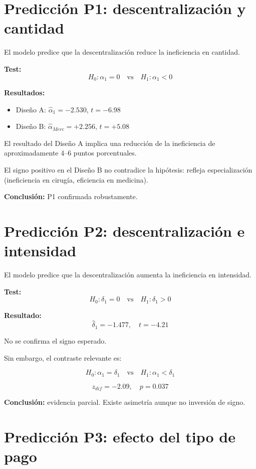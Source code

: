 \documentclass[12pt]{article}
\begin{document}
\section{Predicción P1: descentralización y cantidad}

El modelo predice que la descentralización reduce la ineficiencia en cantidad.

\textbf{Test:}
\[
H_0: \alpha_1 = 0 \quad \text{vs} \quad H_1: \alpha_1 < 0
\]

\textbf{Resultados:}
\begin{itemize}
\item Diseño A: $\hat{\alpha}_1 = -2.530$, $t = -6.98$
\item Diseño B: $\hat{\alpha}_{Merc} = +2.256$, $t = +5.08$
\end{itemize}

El resultado del Diseño A implica una reducción de la ineficiencia de aproximadamente 4--6 puntos porcentuales.

El signo positivo en el Diseño B no contradice la hipótesis: refleja especialización (ineficiencia en cirugía, eficiencia en medicina).

\textbf{Conclusión:} P1 confirmada robustamente.

\section{Predicción P2: descentralización e intensidad}

El modelo predice que la descentralización aumenta la ineficiencia en intensidad.

\textbf{Test:}
\[
H_0: \delta_1 = 0 \quad \text{vs} \quad H_1: \delta_1 > 0
\]

\textbf{Resultado:}
\[
\hat{\delta}_1 = -1.477, \quad t = -4.21
\]

No se confirma el signo esperado.

Sin embargo, el contraste relevante es:

\[
H_0: \alpha_1 = \delta_1 \quad \text{vs} \quad H_1: \alpha_1 < \delta_1
\]

\[
z_{dif} = -2.09, \quad p = 0.037
\]

\textbf{Conclusión:} evidencia parcial. Existe asimetría aunque no inversión de signo.

\section{Predicción P3: efecto del tipo de pago}
\end{document}
